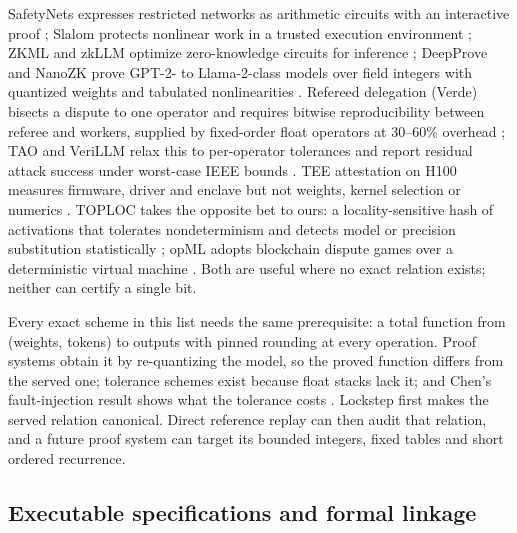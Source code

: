 \documentclass{article}
\begin{document}
SafetyNets expresses restricted networks as arithmetic circuits with an interactive proof
\cite{ghodsi2017safetynets}; Slalom protects nonlinear work in a trusted execution
environment \cite{tramer2019slalom}; ZKML and zkLLM optimize zero-knowledge circuits for
inference \cite{chen2024zkml,sun2024zkllm}; DeepProve and NanoZK prove GPT-2- to
Llama-2-class models over field integers with quantized weights and tabulated nonlinearities
\cite{deepprove2026,nanozk2026}.  Refereed delegation (Verde) bisects a dispute to one
operator and requires bitwise reproducibility between referee and workers, supplied by
fixed-order float operators at 30--60\% overhead \cite{verde2025}; TAO and VeriLLM relax
this to per-operator tolerances and report residual attack success under worst-case IEEE
bounds \cite{tao2025,verillm2025}.  TEE attestation on H100 measures firmware, driver and
enclave but not weights, kernel selection or numerics \cite{nvidia2025cc}.  TOPLOC takes
the opposite bet to ours: a locality-sensitive hash of activations that tolerates
nondeterminism and detects model or precision substitution statistically
\cite{toploc2025}; opML adopts blockchain dispute games over a deterministic virtual
machine \cite{opml2024}.  Both are useful where no exact relation exists; neither can
certify a single bit.

Every exact scheme in this list needs the same prerequisite: a total function from
(weights, tokens) to outputs with pinned rounding at every operation.  Proof systems obtain
it by re-quantizing the model, so the proved function differs from the served one;
tolerance schemes exist because float stacks lack it; and Chen's fault-injection result shows
what the tolerance costs \cite{chen2026pow2}.  Lockstep first makes the served relation
canonical.  Direct reference replay can then audit that relation, and a future proof system
can target its bounded integers, fixed tables and short ordered recurrence.

\subsection{Executable specifications and formal linkage}
\end{document}
